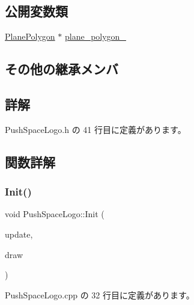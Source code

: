 \subsection*{公開変数類}
\begin{DoxyCompactItemize}
\item 
\mbox{\hyperlink{class_plane_polygon}{Plane\+Polygon}} $\ast$ \mbox{\hyperlink{class_push_space_logo_ab35a4cee269c3ba0b709a8951ccc3d42}{plane\+\_\+polygon\+\_\+}}
\end{DoxyCompactItemize}
\subsection*{その他の継承メンバ}


\subsection{詳解}


 Push\+Space\+Logo.\+h の 41 行目に定義があります。



\subsection{関数詳解}
\mbox{\label{class_push_space_logo_a381d34d0dfdd493eb46f299d2a2ba858}} 
\subsubsection{\texorpdfstring{Init()}{Init()}}
{\footnotesize\ttfamily void Push\+Space\+Logo\+::\+Init (\begin{DoxyParamCaption}\item[{\mbox{\hyperlink{class_update_base}{Update\+Base}} $\ast$}]{update,  }\item[{\mbox{\hyperlink{class_draw_base}{Draw\+Base}} $\ast$}]{draw }\end{DoxyParamCaption})}



 Push\+Space\+Logo.\+cpp の 32 行目に定義があります。

